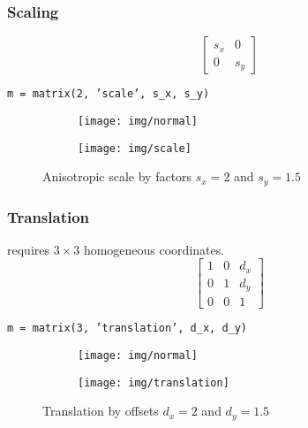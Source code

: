 \documentclass{scrartcl}
\begin{document}
\subsubsection*{Scaling}
$$\left[ \begin{smallmatrix} 
s_x & 0\\
0 & s_y 
\end{smallmatrix} \right]$$

\begin{center}
	\texttt{m = matrix(2, 'scale', s\_x, s\_y)}
\end{center}

\begin{figure}[H]
	\centering
	\begin{subfigure}{.41\textwidth}
		\centering
		\texttt{[image: img/normal]}
	\end{subfigure}%
	\begin{subfigure}{.41\textwidth}
		\centering
		\texttt{[image: img/scale]}
	\end{subfigure}
	\caption{Anisotropic scale by factors $s_x = 2$ and $s_y = 1.5$}
	\label{fig:rot}
\end{figure}
\subsubsection*{Translation}
requires $3 \times 3$ homogeneous coordinates.
$$\left[ \begin{smallmatrix} 
1 & 0 & d_x\\
0 & 1 & d_y\\
0 & 0 & 1 
\end{smallmatrix} \right]$$

\begin{center}
	\texttt{m = matrix(3, 'translation', d\_x, d\_y)}
\end{center}
\begin{figure}[H]
	\centering
	\begin{subfigure}{.41\textwidth}
		\centering
		\texttt{[image: img/normal]}
	\end{subfigure}%
	\begin{subfigure}{.41\textwidth}
		\centering
		\texttt{[image: img/translation]}
	\end{subfigure}
	\caption{Translation by offsets $d_x = 2$ and $d_y = 1.5$}
	\label{fig:rot}
\end{figure}
\end{document}
